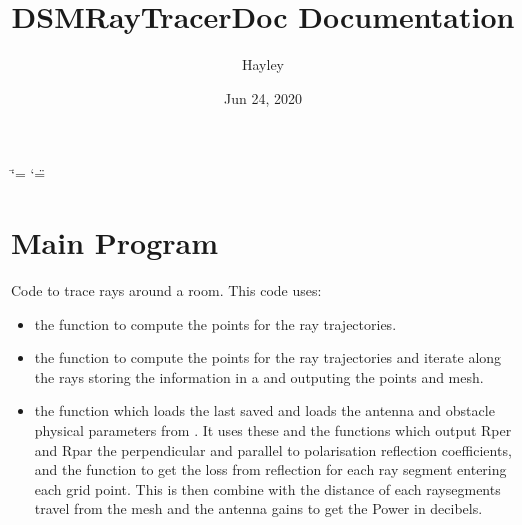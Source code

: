 \documentclass[letterpaper,10pt,english]{sphinxmanual}
\title{DSMRayTracerDoc Documentation}
\date{Jun 24, 2020}
\author{Hayley}
\begin{document}
\ifdefined\shorthandoff
  \ifnum\catcode`\=\string=\active\shorthandoff{=}\fi
  \ifnum\catcode`\"=\active{}\fi
\fi

\pagestyle{empty}
\sphinxmaketitle
\pagestyle{plain}
\sphinxtableofcontents
\pagestyle{normal}
\label{\detokenize{index::doc}}



\chapter{Main Program}
\label{\detokenize{index:module-RayTracerMainProgram}}\label{\detokenize{index:main-program}}
Code to trace rays around a room. This code uses:
\begin{itemize}
\item {} 
the function {\hyperref[\detokenize{index:RayTracerMainProgram.RayTracer}]{}} to compute the points for   the ray trajectories.

\item {} 
the function {\hyperref[\detokenize{index:RayTracerMainProgram.MeshProgram}]{}} to compute the points for   the ray trajectories and iterate along the rays storing the   information in a {\hyperref[\detokenize{index:DictionarySparseMatrix.DS}]{}} and outputing   the points and mesh.

\item {} 
the function {\hyperref[\detokenize{index:RayTracerMainProgram.power_grid}]{}} which loads the last saved   and loads the antenna and obstacle physical parameters from   {\hyperref[\detokenize{index:ParameterInput.ObstacleCoefficients}]{}}. It uses these and   the functions {\hyperref[\detokenize{index:RayTracerMainProgram.RefCoefComputation}]{}} which output Rper   and Rpar the perpendicular and parallel to polarisation reflection   coefficients, and the function {\hyperref[\detokenize{index:RayTracerMainProgram.RefCombine}]{}} to   get the loss from reflection for each ray segment entering each grid   point. This is then combine with the distance of each raysegments   travel from the mesh and the antenna gains to get the Power in   decibels.


\end{itemize}
\end{document}
